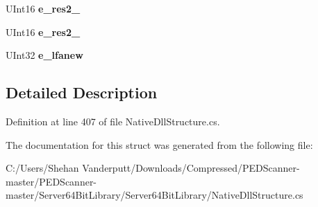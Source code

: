 \begin{DoxyCompactItemize}
\item 
\mbox{\label{struct_class_library_server_1_1_struct_1_1_pe_header_reader_1_1_i_m_a_g_e___d_o_s___h_e_a_d_e_r_a1b60a2587f5eec6575a6d30ccbaffd07}} 
U\+Int16 {\bfseries e\+\_\+res2\+\_}
\item 
\mbox{\label{struct_class_library_server_1_1_struct_1_1_pe_header_reader_1_1_i_m_a_g_e___d_o_s___h_e_a_d_e_r_aa47caa895825f176328a03446e9768cb}} 
U\+Int16 {\bfseries e\+\_\+res2\+\_}
\item 
\mbox{\label{struct_class_library_server_1_1_struct_1_1_pe_header_reader_1_1_i_m_a_g_e___d_o_s___h_e_a_d_e_r_a8ed4b3c04b3eed566e4a12003bff5882}} 
U\+Int32 {\bfseries e\+\_\+lfanew}
\end{DoxyCompactItemize}


\subsection{Detailed Description}


Definition at line 407 of file Native\+Dll\+Structure.\+cs.



The documentation for this struct was generated from the following file\+:\begin{DoxyCompactItemize}
\item 
C\+:/\+Users/\+Shehan Vanderputt/\+Downloads/\+Compressed/\+P\+E\+D\+Scanner-\/master/\+P\+E\+D\+Scanner-\/master/\+Server64\+Bit\+Library/\+Server64\+Bit\+Library/Native\+Dll\+Structure.\+cs\end{DoxyCompactItemize}
